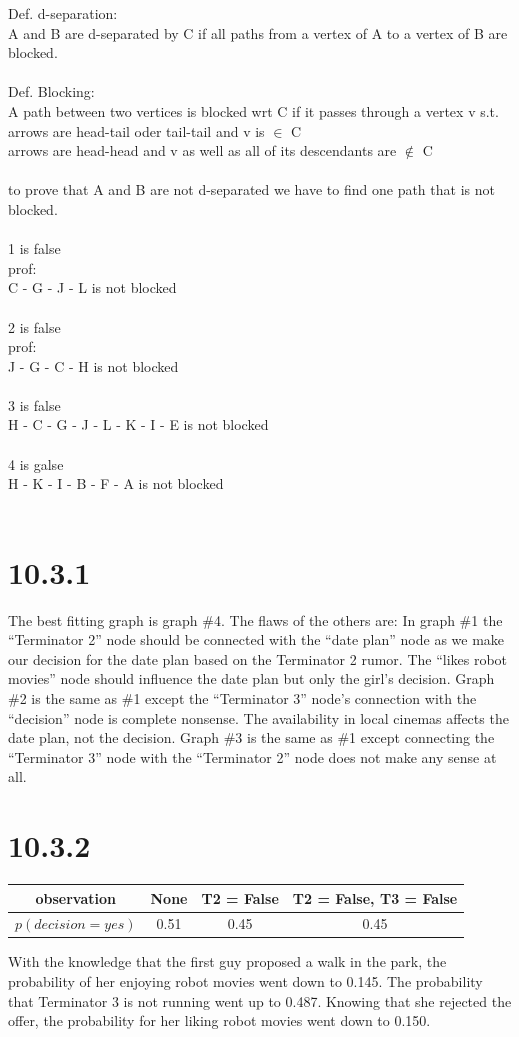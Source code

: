 \documentclass[a4paper,11pt]{article}
\theoremstyle{definition}
\theoremstyle{plain}
\theoremstyle{remark}
\begin{document}
Def. d-separation:\\
A and B are d-separated by C if all paths from a vertex of A to a vertex of B are blocked.\\
\\
Def. Blocking:\\
A path between two vertices is blocked wrt C if it passes through a vertex v s.t.\\
      arrows are head-tail oder tail-tail and v is $\in$ C\\
      arrows are head-head and v as well as all of its descendants are ${\not\in}$ C\\
\\
to prove that A and B are not d-separated we have to find one path that is not blocked.\\
\\
1 is false\\
prof: \\
C - G - J - L is not blocked\\
\\
2 is false\\
prof: \\
J - G - C - H is not blocked\\
\\
3 is false\\
H - C - G - J - L - K - I - E is not blocked\\
\\
4 is galse\\
H - K - I - B - F - A is not blocked\\
\\
\section*{10.3.1}
The best fitting graph is graph \#4. The flaws of the others are:
In graph \#1 the ``Terminator 2'' node should be connected with the ``date plan'' node as we make our decision for the date plan based on the Terminator 2 rumor. The ``likes robot movies'' node should influence the date plan but only the girl's decision. Graph \#2 is the same as \#1 except the ``Terminator 3'' node's connection with the ``decision'' node is complete nonsense. The availability in local cinemas affects the date plan, not the decision. Graph \#3 is the same as \#1 except connecting the ``Terminator 3'' node with the ``Terminator 2'' node does not make any sense at all.

\section*{10.3.2}
\begin{table}[H]
\centering
\begin{tabular}{|c|c|c|c|}
\hline
observation & None & T2 = False & T2 = False, T3 = False \\ \hline
$p(decision = yes)$ & 0.51 & 0.45 & 0.45 \\ \hline
\end{tabular}
\end{table}

With the knowledge that the first guy proposed a walk in the park, the probability of her enjoying robot movies went down to 0.145. The probability that Terminator 3 is not running went up to 0.487. Knowing that she rejected the offer, the probability for her liking robot movies went down to 0.150.
\end{document}
